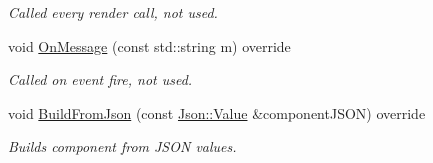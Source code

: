 \begin{DoxyCompactItemize}
\begin{DoxyCompactList}\small\item\em Called every render call, not used. \end{DoxyCompactList}\item 
\mbox{\label{class_camera_component_a1cd7e6036568be5bf45d249d8f96a596}} 
void \mbox{\hyperlink{class_camera_component_a1cd7e6036568be5bf45d249d8f96a596}{On\+Message}} (const std\+::string m) override
\begin{DoxyCompactList}\small\item\em Called on event fire, not used. \end{DoxyCompactList}\item 
\mbox{\label{class_camera_component_ae356a12312239d399984ac5b5aaa7adf}} 
void \mbox{\hyperlink{class_camera_component_ae356a12312239d399984ac5b5aaa7adf}{Build\+From\+Json}} (const \mbox{\hyperlink{class_json_1_1_value}{Json\+::\+Value}} \&component\+J\+S\+ON) override
\begin{DoxyCompactList}\small\item\em Builds component from J\+S\+ON values. \end{DoxyCompactList}\end{DoxyCompactItemize}
